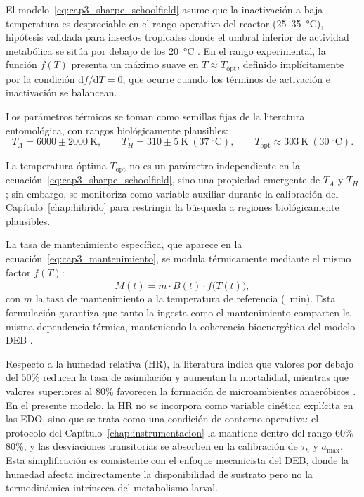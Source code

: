 El modelo~\eqref{eq:cap3_sharpe_schoolfield} asume que la inactivación a baja temperatura es despreciable en el rango operativo del reactor (\SI{25}{}--\SI{35}{\celsius}), hipótesis validada para insectos tropicales donde el umbral inferior de actividad metabólica se sitúa por debajo de los \SI{20}{\celsius} \parencite{chiaBlackSoldierFly2019}. En el rango experimental, la función $f(T)$ presenta un máximo suave en $T \approx T_{\mathrm{opt}}$, definido implícitamente por la condición $\mathrm{d}f/\mathrm{d}T = 0$, que ocurre cuando los términos de activación e inactivación se balancean.

Los parámetros térmicos se toman como semillas fijas de la literatura entomológica, con rangos biológicamente plausibles:
\begin{equation}
    T_A = 6000 \pm 2000\ \si{\kelvin}, \qquad
    T_H = 310 \pm 5\ \si{\kelvin}\ (\SI{37}{\celsius}), \qquad
    T_{\mathrm{opt}} \approx 303\ \si{\kelvin}\ (\SI{30}{\celsius}).
    \label{eq:cap3_rangos_termicos}
\end{equation}

La temperatura óptima $T_{\mathrm{opt}}$ no es un parámetro independiente en la ecuación~\eqref{eq:cap3_sharpe_schoolfield}, sino una propiedad emergente de $T_A$ y $T_H$; sin embargo, se monitoriza como variable auxiliar durante la calibración del Capítulo~\ref{chap:hibrido} para restringir la búsqueda a regiones biológicamente plausibles.

La tasa de mantenimiento específica, que aparece en la ecuación~\eqref{eq:cap3_mantenimiento}, se modula térmicamente mediante el mismo factor $f(T)$:
\begin{equation}
    \dot{M}(t) = m \cdot B(t) \cdot f\bigl(T(t)\bigr),
    \label{eq:cap3_mantenimiento_termico}
\end{equation}
con $m$ la tasa de mantenimiento a la temperatura de referencia (\si{\per\minute}). Esta formulación garantiza que tanto la ingesta como el mantenimiento comparten la misma dependencia térmica, manteniendo la coherencia bioenergética del modelo DEB \parencite{eriksenDynamicModellingFeed2022}.

Respecto a la humedad relativa (HR), la literatura indica que valores por debajo del $50\%$ reducen la tasa de asimilación y aumentan la mortalidad, mientras que valores superiores al $80\%$ favorecen la formación de microambientes anaeróbicos \parencite{bekkerImpactSubstrateMoisture2021a}. En el presente modelo, la HR no se incorpora como variable cinética explícita en las EDO, sino que se trata como una condición de contorno operativa: el protocolo del Capítulo~\ref{chap:instrumentacion} la mantiene dentro del rango $60\%$--$80\%$, y las desviaciones transitorias se absorben en la calibración de $\tau_h$ y $a_{\max}$. Esta simplificación es consistente con el enfoque mecanicista del DEB, donde la humedad afecta indirectamente la disponibilidad de sustrato pero no la termodinámica intrínseca del metabolismo larval.

